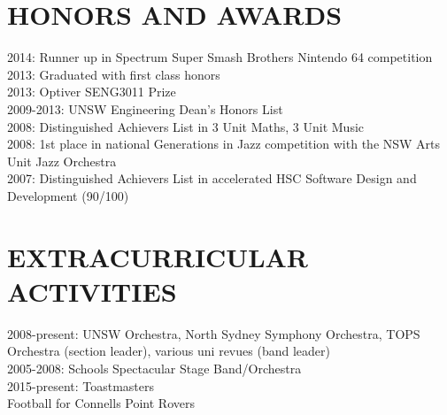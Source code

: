 \documentclass{res}
\begin{document}
\begin{resume}
\section{HONORS AND AWARDS}          
    2014: Runner up in Spectrum Super Smash Brothers Nintendo 64 competition \\
    2013: Graduated with first class honors \\
    2013: Optiver SENG3011 Prize \\
    2009-2013: UNSW Engineering Dean's Honors List \\
    2008: Distinguished Achievers List in 3 Unit Maths, 3 Unit Music \\
    2008: 1st place in national Generations in Jazz competition with the NSW Arts Unit Jazz Orchestra \\
    2007: Distinguished Achievers List in accelerated HSC Software Design and Development (90/100)
 
\section{EXTRACURRICULAR ACTIVITIES}          
    2008-present: UNSW Orchestra, North Sydney Symphony Orchestra, TOPS Orchestra (section leader), various uni revues (band leader) \\
    2005-2008: Schools Spectacular Stage Band/Orchestra \\
    2015-present: Toastmasters \\
    Football for Connells Point Rovers
 
\end{resume}
\end{document}
